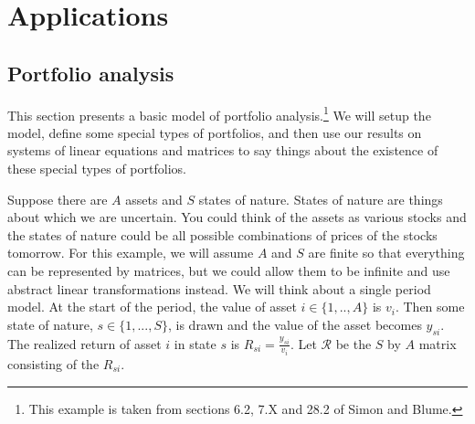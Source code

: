 \documentclass[12pt,reqno]{amsart}
\theoremstyle{definition}
\begin{document}
\section{Applications}

\subsection{Portfolio analysis}

This section presents a basic model of portfolio
analysis.\footnote{This example is taken from sections 6.2, 7.X and
  28.2 of Simon and Blume.} We will setup the model, define some
special types of portfolios, and then use our results on systems of
linear equations and matrices to say things about the existence of
these special types of portfolios. 

Suppose there are $A$ assets and $S$ states of nature. States of
nature are things about which we are uncertain. You could think of the
assets as various stocks and the states of nature could be all
possible combinations of prices of the stocks tomorrow. For this
example, we will assume $A$ and $S$ are finite so that everything can
be represented by matrices, but we could allow them to be infinite and
use abstract linear transformations instead.  We will think about a
single period model. At the start of the period, the value of asset $i
\in \{1,..,A\}$ is $v_i$. Then some state of nature, $s \in \{1, ...,
S\}$, is drawn and the value of the asset becomes $y_{si}$. The
realized return of asset $i$ in state $s$ is $R_{si} =
\frac{y_{si}}{v_i}$. Let $\mathcal{R}$ be the $S$ by $A$ matrix
consisting of the $R_{si}$.
\end{document}
